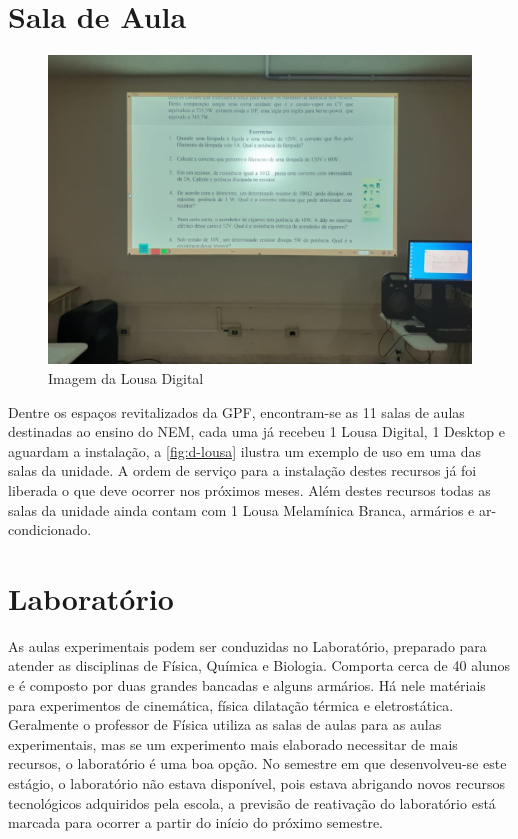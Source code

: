\section{Sala de Aula} %
\label{sec:Sala de Aula}
\setlength\intextsep{0pt}
\begin{figure}
	\centering
	\caption{Imagem da Lousa Digital}
	\label{fig:d-lousa}
	\includegraphics[width=.45\textwidth]{assets/d-lousa.jpeg}
\end{figure}
Dentre os espaços revitalizados da \ac{GPF}, encontram-se as 11 salas de aulas destinadas ao ensino do \ac{NEM}, cada uma já recebeu 1 Lousa Digital, 1 Desktop e aguardam a instalação, a \autoref{fig:d-lousa} ilustra um exemplo de uso em uma das salas da unidade. A ordem de serviço para a instalação destes recursos já foi liberada o que deve ocorrer nos próximos meses. Além destes recursos todas as salas da unidade ainda contam com 1 Lousa Melamínica Branca, armários e ar-condicionado.

\section{Laboratório} %
\label{sec:Laboratório}
As aulas experimentais podem ser conduzidas no Laboratório, preparado para atender as disciplinas de Física, Química e Biologia. Comporta cerca de 40 alunos e é composto por duas grandes bancadas e alguns armários. Há nele matériais para experimentos de cinemática, física dilatação térmica e eletrostática. Geralmente o professor de Física utiliza as salas de aulas para as aulas experimentais, mas se um experimento mais elaborado necessitar de mais recursos, o laboratório é uma boa opção. No semestre em que desenvolveu-se este estágio, o laboratório não estava disponível, pois estava abrigando novos recursos tecnológicos adquiridos pela escola, a previsão de reativação do laboratório está marcada para ocorrer a partir do início do próximo semestre.


